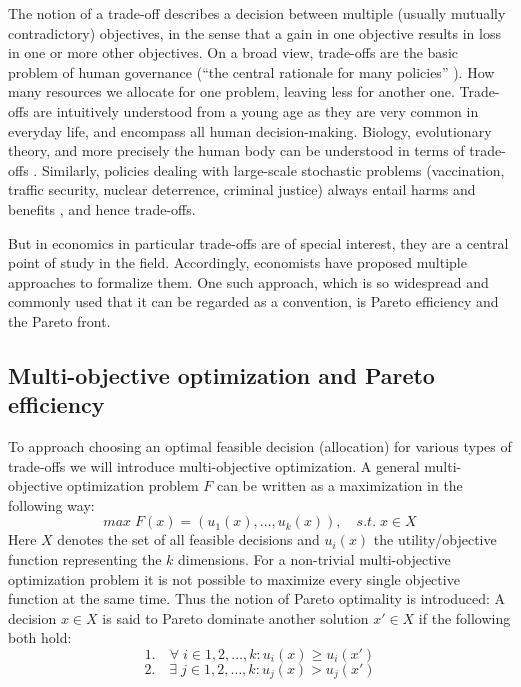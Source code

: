 

	The notion of a trade-off describes a decision between multiple (usually mutually contradictory) objectives, in the sense that a gain in one objective results in loss in one or more other objectives.
	On a broad view, trade-offs are the basic problem of human governance (``the central rationale for many policies'' \cite[p.~77]{Hardin1989}).
    How many resources we allocate for one problem, leaving less for another one.
	Trade-offs are intuitively understood from a young age as they are very common in everyday life, and encompass all human decision-making.
	Biology, evolutionary theory, and more precisely the human body can be understood in terms of trade-offs \cite{Launer2020}.
	Similarly, policies dealing with large-scale stochastic problems (vaccination, traffic security, nuclear deterrence, criminal justice) always entail harms and benefits \cite{Hardin1989}, and hence trade-offs.

	But in economics in particular trade-offs are of special interest, they are a central point of study in the field.
	Accordingly, economists have proposed multiple approaches to formalize them.
	One such approach, which is so widespread and commonly used that it can be regarded as a convention, is Pareto efficiency and the Pareto front.

	\subsection{Multi-objective optimization and Pareto efficiency}

	To approach choosing an optimal feasible decision (allocation) for various types of trade-offs we will introduce multi-objective optimization.
	A general multi-objective optimization problem $F$ can be written as a maximization in the following way:
	$$max \; F(x)=(u_1(x),\dots,u_k(x)), \quad s.t.\; x\in X$$
	Here $X$ denotes the set of all feasible decisions and $u_i(x)$ the utility/objective function representing the $k$ dimensions.
	For a non-trivial multi-objective optimization problem it is not possible to maximize every single objective function at the same time.
	Thus the notion of Pareto optimality is introduced:
	A decision $x\in X$ is said to Pareto dominate another solution $x'\in X$ if the following both hold:
	$$1.\quad \forall\; i\in {1,2,\dots,k}: u_i(x)\ge u_i(x')$$
	$$2.\quad \exists\; j\in {1,2,\dots,k}: u_j(x) > u_j(x')$$

